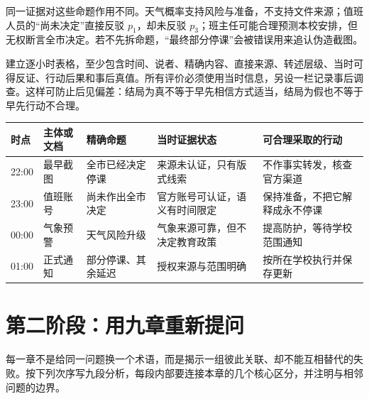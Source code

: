 同一证据对这些命题作用不同。天气概率支持风险与准备，不支持文件来源；值班人员的“尚未决定”直接反驳 \(p_1\)，却未反驳 \(p_3\)；班主任可能合理预测本校安排，但无权断言全市决定。若不先拆命题，“最终部分停课”会被错误用来追认伪造截图。

建立逐小时表格，至少包含时间、说者、精确内容、直接来源、转述层级、当时可得反证、行动后果和事后真值。所有评价必须使用当时信息，另设一栏记录事后调查。这样可防止后见偏差：结局为真不等于早先相信方式适当，结局为假也不等于早先行动不合理。

\begin{longtable}{p{}p{}p{}p{}p{}}
\toprule
时点 & 主体或文档 & 精确命题 & 当时证据状态 & 可合理采取的行动\\\midrule\endhead
22:00 & 最早截图 & 全市已经决定停课 & 来源未认证，只有版式线索 & 不作事实转发，核查官方渠道\\
23:00 & 值班账号 & 尚未作出全市决定 & 官方账号可认证，语义有时间限定 & 保持准备，不把它解释成永不停课\\
00:00 & 气象预警 & 天气风险升级 & 气象来源可靠，但不决定教育政策 & 提高防护，等待学校范围通知\\
01:00 & 正式通知 & 部分停课、其余延迟 & 授权来源与范围明确 & 按所在学校执行并保存更新\\
\bottomrule
\end{longtable}

\section{第二阶段：用九章重新提问}

每一章不是给同一问题换一个术语，而是揭示一组彼此关联、却不能互相替代的失败。按下列次序写九段分析，每段内部要连接本章的几个核心区分，并注明与相邻问题的边界。

